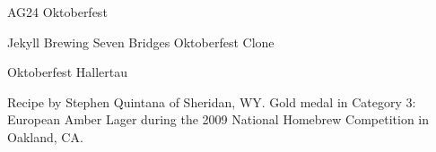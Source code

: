 \begin{recipe}{AG24 Oktoberfest}
\begin{recipe}{Jekyll Brewing Seven Bridges Oktoberfest Clone}
\begin{ingredientsblock}
\end{ingredientsblock}

\end{recipe}

\begin{recipe}{Oktoberfest Hallertau} %

\begin{aboutblock}
Recipe by Stephen Quintana of Sheridan, WY. Gold medal in Category 3: European
Amber Lager during the 2009 National Homebrew Competition in Oakland, CA.
\sourceaha
\end{aboutblock}


\begin{methodandtiming}

\begin{mashsteps}
\end{mashsteps}

\begin{fermentationsteps}
\end{fermentationsteps}

\end{methodandtiming}

\recipebreak

\begin{ingredientsblock}

\begin{malts}
\end{malts}

\begin{hops}
\end{hops}


\end{ingredientsblock}

\end{recipe}


\end{recipe}
